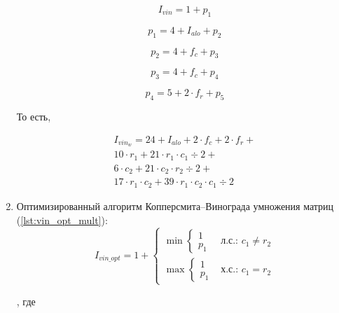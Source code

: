 \begin{enumerate}
    \begin{equation*}
        I_{vin} = 1 + p_1
    \end{equation*}

    \begin{equation*}
        p_1 = 4 + I_{alo} + p_2
    \end{equation*}

    \begin{equation*}
        p_2 = 4 + f_c + p_3
    \end{equation*}

    \begin{equation*}
        p_3 = 4 + f_c + p_4
    \end{equation*}

    \begin{equation*}
        p_4 = 5 + 2 \cdot f_r + p_5
    \end{equation*}

    То есть,

    \begin{eqnarray*}
        I_{vin_w} = 24 + I_{alo} + 2 \cdot f_c + 2 \cdot f_r + \\
        10 \cdot r_1 + 21 \cdot r_1 \cdot c_1 \div 2 + \\
        6 \cdot c_2 + 21 \cdot c_2 \cdot r_2 \div 2 + \\
        17 \cdot r_1 \cdot c_2 + 39 \cdot r_1 \cdot c_2 \cdot c_1 \div 2
    \end{eqnarray*}

    \item Оптимизированный алгоритм Копперсмита--Винограда умножения матриц (\ref{lst:vin_opt_mult}):
    \begin{equation*}
        I_{vin\_opt} =
        1 +
        \begin{cases}
            \min
            \begin{cases}
                1 \\
                p_1
            \end{cases} & \textit{л.с.: $c_1 \ne r_2$} \\
            \max
            \begin{cases}
                1 \\
                p_1
            \end{cases} & \textit{х.с.: $c_1 = r_2$}
        \end{cases}
    \end{equation*}

    , где


\end{enumerate}
